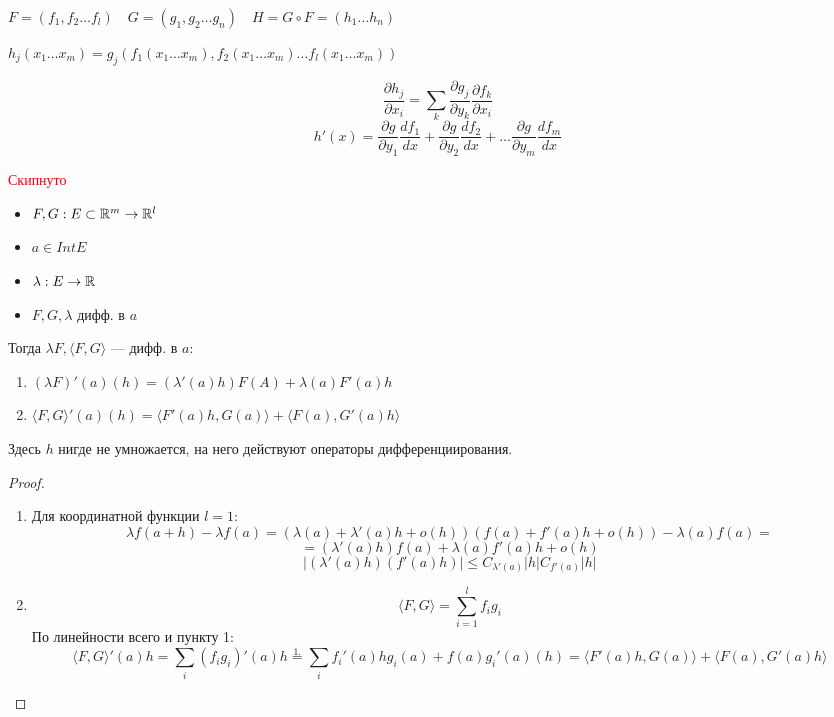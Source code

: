 

$F=(f_1, f_2\ldots f_l) \quad G=(g_1, g_2\ldots g_n) \quad H=G\circ F = (h_1\ldots h_n)$

$h_j(x_1\ldots x_m)=g_j(f_1(x_1\ldots x_m), f_2(x_1\ldots x_m)\ldots f_l(x_1\ldots x_m))$

$$\frac{\partial h_j}{\partial x_i} = \sum_k \frac{\partial g_j}{\partial y_k} \frac{\partial f_k}{\partial x_i} $$
$$h'(x)=\frac{\partial g}{\partial y_1} \frac{df_1}{d x} + \frac{\partial g}{\partial y_2} \frac{df_2}{d x}+\ldots\frac{\partial g}{\partial y_m} \frac{df_m}{d x}$$

\textcolor{red}{Скипнуто}

\begin{lemma}
    \begin{itemize}[itemsep=1mm, after=\vspace{3mm}]
        \item $F, G: E\subset \mathbb{R}^m \to\mathbb{R}^l$
        \item $a\in IntE$
        \item $\lambda:E\to\mathbb{R}$
        \item $F,G,\lambda$ дифф. в $a$
    \end{itemize}

    Тогда $\lambda F, \langle F, G\rangle$ --- дифф. в $a$:
    \begin{enumerate}
        \item $(\lambda F)'(a) (h) = (\lambda'(a)h)F(A) + \lambda(a) F'(a)h$
        \item $\langle F, G\rangle'(a) (h) = \langle F'(a)h, G(a) \rangle + \langle F(a), G'(a)h\rangle$
    \end{enumerate}
    
    Здесь $h$ нигде не умножается, на него действуют операторы дифференциирования.
\end{lemma}
\begin{proof}
    \begin{enumerate}
        \item Для координатной функции $l=1$:
        $$\lambda f(a+h)-\lambda f(a) = (\lambda(a)+\lambda'(a)h+o(h))(f(a)+f'(a)h+o(h))-\lambda(a)f(a)=$$
        $$=(\lambda'(a)h)f(a)+\lambda(a)f'(a)h+o(h)$$
        $$|(\lambda'(a)h)(f'(a)h)|\le C_{\lambda'(a)}|h|C_{f'(a)}|h|$$

        \item $$\langle F,G\rangle=\sum_{i=1}^l f_ig_i$$
        По линейности всего и пункту 1:
        $$\langle F,G\rangle'(a)h=\sum_i (f_ig_i)'(a)h\stackrel{1.}{=}\sum_i f_i'(a)h g_i(a)+f(a)g_i'(a)(h)=\langle F'(a)h, G(a) \rangle + \langle F(a), G'(a)h\rangle$$
    \end{enumerate}
\end{proof}

